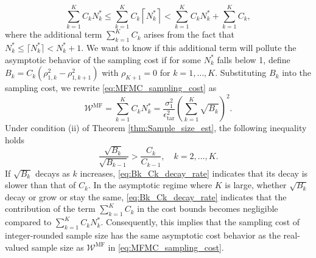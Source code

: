\begin{equation}\label{eq:sampling_cost_bound}
    \sum_{k=1}^K C_k N_k^*\le \sum_{k=1}^K C_k \left\lceil N_k^*\right\rceil<\sum_{k=1}^K C_k N_k^* + \sum_{k=1}^K C_k,
\end{equation}
%
where the additional term $\sum_{k=1}^K C_k$ arises from the fact that $N_k^*\le \lceil N_k^*\rceil< N_k^*+1$. We want to know if this additional term will pollute the asymptotic behavior of the sampling cost if for some $N_k^*$ falls below 1, define $B_k = C_k(\rho_{1,k}^2 - \rho_{1,k+1}^2)$ with $\rho_{K+1}=0$ for $k=1,\dots, K$. Substituting $B_k$ into the sampling cost, we rewrite \eqref{eq:MFMC_sampling_cost} as
%
\begin{equation*}\label{eq:MFMC_sampling_cost_2}
    \mathcal{W}^{\text{MF}} = \sum_{k=1}^K C_k N_k^* = \frac{\sigma_1^2}{\epsilon_{\text{tar}}^2}\left(\sum_{k=1}^K\sqrt{B_k} \right)^2.
\end{equation*}
%
Under condition (ii) of Theorem \ref{thm:Sample_size_est}, the following inequality holds
%
\begin{equation}
\label{eq:Bk_Ck_decay_rate}
    \frac{\sqrt{B_{k}}}{\sqrt{B_{k-1}}}>\frac{C_{k}}{C_{k-1}}, \quad k=2,\ldots,K.
\end{equation}
%
If $\sqrt{B_k}$ decays as $k$ increases, \eqref{eq:Bk_Ck_decay_rate} indicates that its decay is slower than that of $C_k$. In the asymptotic regime where $K$ is large, whether $\sqrt{B_k}$ decay or grow or stay the same, \eqref{eq:Bk_Ck_decay_rate} indicates that the contribution of the term $\sum_{k=1}^K C_k$ in the cost bounds becomes negligible compared to $\sum_{k=1}^K C_kN_k^*$. Consequently, this implies that the sampling cost of integer-rounded sample size has the same asymptotic cost behavior as the real-valued sample size as $\mathcal{W}^\text{MF}$ in \eqref{eq:MFMC_sampling_cost}.




